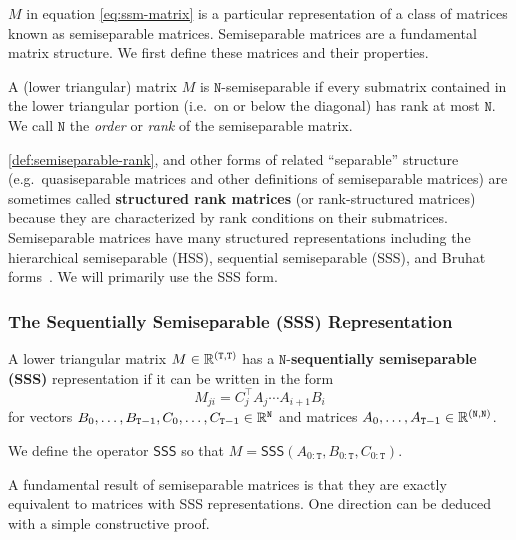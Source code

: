 $M$ in equation \eqref{eq:ssm-matrix} is a particular representation of a class of matrices known as semiseparable matrices.
Semiseparable matrices are a fundamental matrix structure.
We first define these matrices and their properties.

\begin{definition}
  \label{def:semiseparable-rank}
  A (lower triangular) matrix $M$ is $\mathtt{N}$-semiseparable if every submatrix contained in the lower triangular portion (i.e.\ on or below the diagonal) has rank at most $\mathtt{N}$.
  We call $\mathtt{N}$ the \emph{order} or \emph{rank} of the semiseparable matrix.
\end{definition}

\cref{def:semiseparable-rank}, and other forms of related ``separable'' structure (e.g.\ quasiseparable matrices and other definitions of semiseparable matrices) are sometimes called \textbf{structured rank matrices} (or rank-structured matrices) because they are characterized by rank conditions on their submatrices.
Semiseparable matrices have many structured representations including the hierarchical semiseparable (HSS),
sequential semiseparable (SSS), and Bruhat forms~\citep{pernet2018time}.
We will primarily use the SSS form.

\subsubsection{The Sequentially Semiseparable (SSS) Representation}

\begin{definition}
  \label{def:sss}
  A lower triangular matrix $M \in \mathbb{R}^{\mathtt{(T,T)}}$ has a $\mathtt{N}$-\textbf{sequentially semiseparable (SSS)} representation if it can be written in the form
  \begin{equation}%
    \label{eq:sss}
    M_{ji} = C_j^{\top} A_{j} \cdots A_{i+1} B_{i}
  \end{equation}
  for vectors $B_{0}, \dots, B_{\mathtt{T}-1}, C_{0}, \dots, C_{\mathtt{T}-1} \in \mathbb{R}^{\mathtt{N}}$
  and matrices $A_{0}, \dots, A_{\mathtt{T}-1} \in \mathbb{R}^{\mathtt{(N,N)}}$.

  We define the operator $\mathsf{SSS}$ so that $M = \mathsf{SSS}(A_{0:\mathtt{T}}, B_{0:\mathtt{T}}, C_{0:\mathtt{T}})$.
\end{definition}

A fundamental result of semiseparable matrices is that they are exactly equivalent to matrices with SSS representations.
One direction can be deduced with a simple constructive proof.

